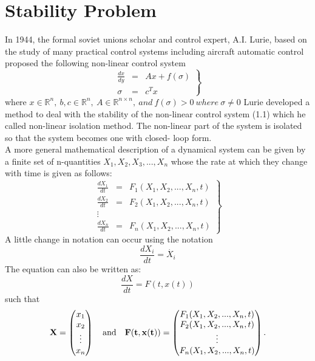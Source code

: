 \documentclass[a4paper,12pt]{report}
\numberwithin{equation}{section}
\begin{document}
\section{Stability Problem}
In 1944, the formal soviet unions scholar and control expert, A.I. Lurie, based on the study of many practical control systems including aircraft automatic control proposed the following non-linear control system
 \begin{equation} \left.
 \begin{array}{lllll}
 \frac{dx}{dy} &=& Ax + f( \sigma)\\ 
\sigma &=& c^T x
\end{array} \right\}
\end{equation} 
where $ x\in \mathbb{R}^n, \ b,c \in \mathbb{R}^n, \ A \in \mathbb{R}^{n \times n}, \ and \ f( \sigma ) > 0\ where \ \sigma \neq 0 $
Lurie developed a method to deal with the stability of the non-linear control system (1.1) which he called non-linear isolation method. The non-linear part of the system is isolated so that the system becomes one with closed- loop form.\\
A more general mathematical description of a dynamical system can be given by a finite set of n-quantities $ X_1,X_2,X_3,..., X_n $ whose the rate at which they change with time is given as follows:
\begin{equation} \left.
\begin{array}{lllll}
\frac{dX_1}{dt} &=& F_1(X_1, X_2,..., X_n, t)\\
\frac{dX_2}{dt} &=& F_2(X_1, X_2,..., X_n, t)\\
\vdots \\
\frac{dX_n}{dt} &=& F_n(X_1, X_2,..., X_n,t)
\end{array} \right\}
\end{equation}
A little change in notation can occur using the notation
\begin{equation*}
\frac{dX_i}{dt} = \dot{X_i}
\end{equation*}
The equation can also be written as:
\begin{equation}
\frac{dX}{dt} = F(t, x(t))
\end{equation}
such that
\[\textbf{X}=\begin{pmatrix}
x_{1}\\
x_{2}\\
\vdots\\
x_{n}
\end{pmatrix}\quad\text{and}\quad {\bf F(t,x(t))}=\begin{pmatrix}
F_1(X_1, X_2,..., X_n, t)
\\ F_2(X_1, X_2,..., X_n, t)
\\ \vdots
 \\ F_n(X_1, X_2,..., X_n,t)
\end{pmatrix}.\] \\
\end{document}
